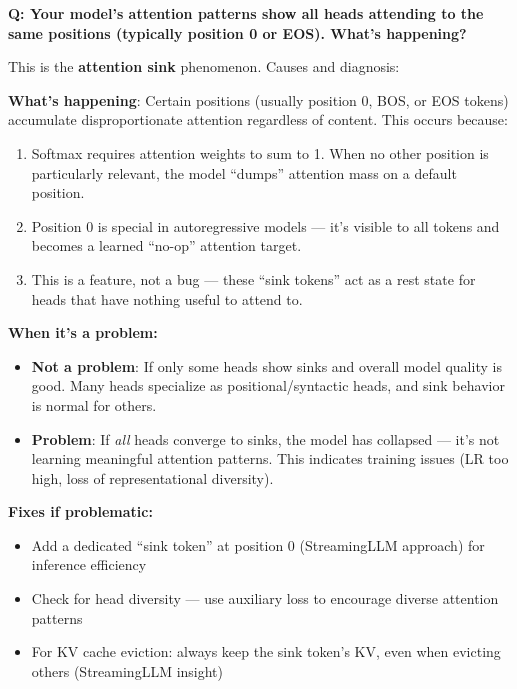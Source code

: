 \begin{interviewq}
\textbf{Q: Your model's attention patterns show all heads attending to the same positions (typically position 0 or EOS). What's happening?}

 \quad {} \quad \badgefreq{\freqlow}

\stronganswer

This is the \textbf{attention sink} phenomenon. Causes and diagnosis:

\textbf{What's happening}: Certain positions (usually position 0, BOS, or EOS tokens) accumulate disproportionate attention regardless of content. This occurs because:
\begin{enumerate}
    \item Softmax requires attention weights to sum to 1. When no other position is particularly relevant, the model ``dumps'' attention mass on a default position.
    \item Position 0 is special in autoregressive models --- it's visible to all tokens and becomes a learned ``no-op'' attention target.
    \item This is a feature, not a bug --- these ``sink tokens'' act as a rest state for heads that have nothing useful to attend to.
\end{enumerate}

\textbf{When it's a problem:}
\begin{itemize}
    \item \textbf{Not a problem}: If only some heads show sinks and overall model quality is good. Many heads specialize as positional/syntactic heads, and sink behavior is normal for others.
    \item \textbf{Problem}: If \textit{all} heads converge to sinks, the model has collapsed --- it's not learning meaningful attention patterns. This indicates training issues (LR too high, loss of representational diversity).
\end{itemize}

\textbf{Fixes if problematic:}
\begin{itemize}
    \item Add a dedicated ``sink token'' at position 0 (StreamingLLM approach) for inference efficiency
    \item Check for head diversity --- use auxiliary loss to encourage diverse attention patterns
    \item For KV cache eviction: always keep the sink token's KV, even when evicting others (StreamingLLM insight)
\end{itemize}


\end{interviewq}
